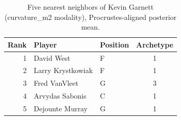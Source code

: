 \begin{table}[htbp]
  \centering\small
  \begin{tabular}{rllc}
    \toprule
    Rank & Player & Position & Archetype \\
    \midrule
    1 & David West & F & 1 \\
    2 & Larry Krystkowiak & F & 1 \\
    3 & Fred VanVleet & G & 3 \\
    4 & Arvydas Sabonis & C & 1 \\
    5 & Dejounte Murray & G & 1 \\
    \bottomrule
  \end{tabular}
  \caption{Five nearest neighbors of Kevin Garnett (curvature_m2 modality), Procrustes-aligned posterior mean.}
  \label{tab:Kevin_Garnett_neighbors_curvature_m2}
\end{table}

